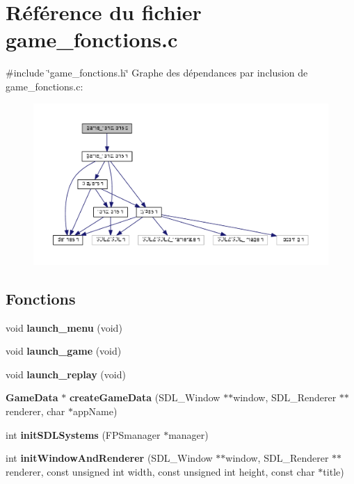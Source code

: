 \section{Référence du fichier game\+\_\+fonctions.\+c}
\label{game__fonctions_8c}
{\ttfamily \#include \char`\"{}game\+\_\+fonctions.\+h\char`\"{}}\newline
Graphe des dépendances par inclusion de game\+\_\+fonctions.\+c\+:
\nopagebreak
\begin{figure}[H]
\begin{center}
\leavevmode
\includegraphics[width=350pt]{game__fonctions_8c__incl}
\end{center}
\end{figure}
\subsection*{Fonctions}
\begin{DoxyCompactItemize}
\item 
\mbox{\label{game__fonctions_8c_ab3538182e6fae78c414c6b371c6f9b77}} 
void {\bfseries launch\+\_\+menu} (void)
\item 
\mbox{\label{game__fonctions_8c_ae1e52800cf2d4cb84e2c71d6af390622}} 
void {\bfseries launch\+\_\+game} (void)
\item 
\mbox{\label{game__fonctions_8c_af44b6382ab2dcccef07d61d735915bfa}} 
void {\bfseries launch\+\_\+replay} (void)
\item 
\mbox{\label{game__fonctions_8c_a5c9adc58626460dbf4f5280f43cafebf}} 
\textbf{ Game\+Data} $\ast$ {\bfseries create\+Game\+Data} (S\+D\+L\+\_\+\+Window $\ast$$\ast$window, S\+D\+L\+\_\+\+Renderer $\ast$$\ast$renderer, char $\ast$app\+Name)
\item 
\mbox{\label{game__fonctions_8c_a4dd7e919802a1f82dd6020412e5db80f}} 
int {\bfseries init\+S\+D\+L\+Systems} (F\+P\+Smanager $\ast$manager)
\item 
\mbox{\label{game__fonctions_8c_ae38078a115bc28d56f1e559a188e7437}} 
int {\bfseries init\+Window\+And\+Renderer} (S\+D\+L\+\_\+\+Window $\ast$$\ast$window, S\+D\+L\+\_\+\+Renderer $\ast$$\ast$renderer, const unsigned int width, const unsigned int height, const char $\ast$title)
\end{DoxyCompactItemize}
